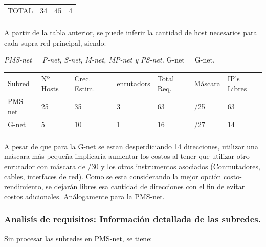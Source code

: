 \begin{longtable}[c]{@{}llll@{}}
\toprule\addlinespace
\begin{minipage}[t]{0.17\columnwidth}\raggedright
TOTAL
\end{minipage} & \begin{minipage}[t]{0.17\columnwidth}\raggedright
34
\end{minipage} & \begin{minipage}[t]{0.17\columnwidth}\raggedright
45
\end{minipage} & \begin{minipage}[t]{0.17\columnwidth}\raggedright
4
\end{minipage}
\\\addlinespace
\bottomrule
\end{longtable}

A partir de la tabla anterior, se puede inferir la cantidad de host
necesarios para cada supra-red principal, siendo:

\emph{PMS-net = P-net, S-net, M-net, MP-net y PS-net. }G-net = G-net.

\begin{longtable}[c]{@{}lllllll@{}}
\toprule\addlinespace
Subred & Nº Hosts & Crec. Estim. & enrutadors & Total Req. & Máscara &
IP's Libres
\\\addlinespace
\midrule\endhead
PMS-net & 25 & 35 & 3 & 63 & /25 & 63
\\\addlinespace
G-net & 5 & 10 & 1 & 16 & /27 & 14
\\\addlinespace
\bottomrule
\end{longtable}

A pesar de que para la G-net se estan desperdiciando 14 direcciones,
utilizar una máscara más pequeña implicaría aumentar los costos al tener
que utilizar otro enrutador con máscara de /30 y los otros instrumentos
asociados (Conmutadores, cables, interfaces de red). Como se esta
considerando la mejor opción costo-rendimiento, se dejarán libres esa
cantidad de direcciones con el fin de evitar costos adicionales.
Análogamente para la PMS-net.

\subsubsection{Analisís de requisitos: Información detallada de las
subredes.}\label{analisuxeds-de-requisitos-informaciuxf3n-detallada-de-las-subredes.}

Sin procesar las subredes en PMS-net, se tiene:

